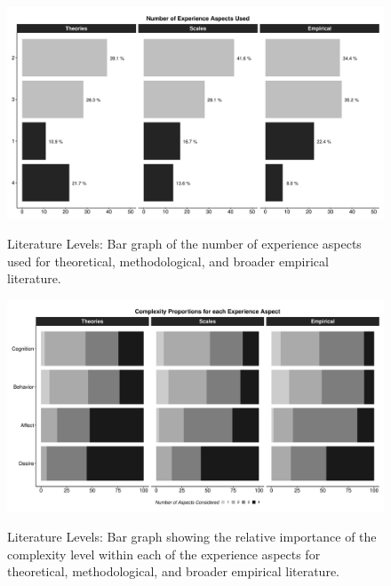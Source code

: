 \begin{figure}[h]
\centering
\caption{Literature Levels: Bar graph of the number of experience aspects used for theoretical, methodological, and broader empirical literature.}
\includegraphics[width=\textwidth]{Figures/CombinedComplexityBar-1}
\label{fig:CombinedComplexity}
\end{figure}

\begin{figure}[h]
\centering
\caption{Literature Levels: Bar graph showing the relative importance of the complexity level within each of the experience aspects for theoretical, methodological, and broader empirical literature.}
\includegraphics[width=\textwidth]{Figures/CombinedAspectComplexityBar-1}
\label{fig:CombinedAspectComplexity}
\end{figure}
